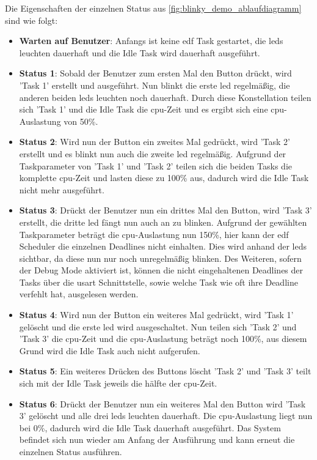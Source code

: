 \documentclass[../EDF Master Thesis.tex]{subfiles}
\begin{document}
        Die Eigenschaften der einzelnen Status aus \autoref{fig:blinky_demo_ablaufdiagramm} sind wie folgt:
        \begin{itemize}
            \item \textbf{Warten auf Benutzer}: Anfangs ist keine \ac{edf} Task gestartet, die \ac{led}s leuchten dauerhaft und die Idle Task wird dauerhaft ausgeführt.
            \item \textbf{Status 1}: Sobald der Benutzer zum ersten Mal den Button drückt, wird 'Task 1' erstellt und ausgeführt.
                Nun blinkt die erste \ac{led} regelmäßig, die anderen beiden \ac{led}s leuchten noch dauerhaft.
                Durch diese Konstellation teilen sich 'Task 1' und die Idle Task die \ac{cpu}-Zeit und es ergibt sich eine \ac{cpu}-Auslastung von 50\%.
            \item \textbf{Status 2}: Wird nun der Button ein zweites Mal gedrückt, wird 'Task 2' erstellt und es blinkt nun auch die zweite \ac{led} regelmäßig.
                Aufgrund der Taskparameter von 'Task 1' und 'Task 2' teilen sich die beiden Tasks die komplette \ac{cpu}-Zeit und lasten diese zu 100\% aus, dadurch wird die Idle Task nicht mehr ausgeführt.
            \item \textbf{Status 3}: Drückt der Benutzer nun ein drittes Mal den Button, wird 'Task 3' erstellt, die dritte \ac{led} fängt nun auch an zu blinken.
                Aufgrund der gewählten Taskparameter beträgt die \ac{cpu}-Auslastung nun 150\%, hier kann der \ac{edf} Scheduler die einzelnen Deadlines nicht einhalten.
                Dies wird anhand der \ac{led}s sichtbar, da diese nun nur noch unregelmäßig blinken.
                Des Weiteren, sofern der Debug Mode aktiviert ist, können die nicht eingehaltenen Deadlines der Tasks über die \ac{usart} Schnittstelle, sowie welche Task wie oft ihre Deadline verfehlt hat, ausgelesen werden.
            \item \textbf{Status 4}: Wird nun der Button ein weiteres Mal gedrückt, wird 'Task 1' gelöscht und die erste \ac{led} wird ausgeschaltet.
                Nun teilen sich 'Task 2' und 'Task 3' die \ac{cpu}-Zeit und die \ac{cpu}-Auslastung beträgt noch 100\%, aus diesem Grund wird die Idle Task auch nicht aufgerufen.
            \item \textbf{Status 5}: Ein weiteres Drücken des Buttons löscht 'Task 2' und 'Task 3' teilt sich mit der Idle Task jeweils die hälfte der \ac{cpu}-Zeit.
            \item \textbf{Status 6}: Drückt der Benutzer nun ein weiteres Mal den Button wird 'Task 3' gelöscht und alle drei \ac{led}s leuchten dauerhaft.
                Die \ac{cpu}-Auslastung liegt nun bei 0\%, dadurch wird die Idle Task dauerhaft ausgeführt.
                Das System befindet sich nun wieder am Anfang der Ausführung und kann erneut die einzelnen Status ausführen.
        \end{itemize}
\end{document}
